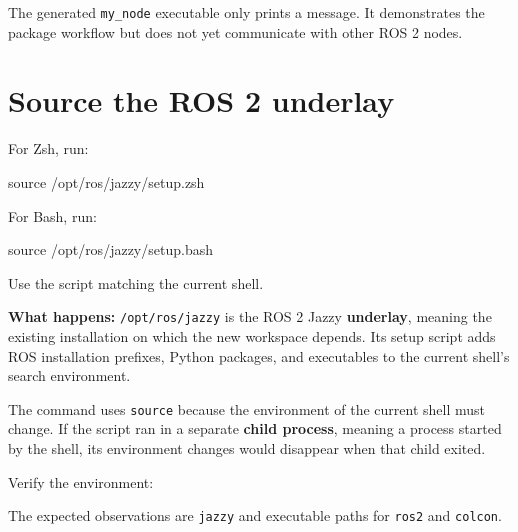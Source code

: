 \documentclass[
  australian,
  12pt,
  letterpaper,
  DIV=11,
  numbers=noendperiod,
  twoside]{scrreprt}
\newenvironment{Shaded}{\begin{snugshade}}{\end{snugshade}}
\newcommand{\AttributeTok}[1]{\textcolor[rgb]{0.40,0.45,0.13}{#1}}
\newcommand{\BuiltInTok}[1]{\textcolor[rgb]{0.00,0.23,0.31}{#1}}
\newcommand{\NormalTok}[1]{\textcolor[rgb]{0.00,0.23,0.31}{#1}}
\newcommand{\StringTok}[1]{\textcolor[rgb]{0.13,0.47,0.30}{#1}}
\newcommand{\VariableTok}[1]{\textcolor[rgb]{0.07,0.07,0.07}{#1}}
\begin{document}
The generated \texttt{my\_node} executable only prints a message. It
demonstrates the package workflow but does not yet communicate with
other ROS 2 nodes.

\section{Source the ROS 2 underlay}\label{source-the-ros-2-underlay}

For Zsh, run:

\begin{Shaded}
\begin{Highlighting}[]
\BuiltInTok{source}\NormalTok{ /opt/ros/jazzy/setup.zsh}
\end{Highlighting}
\end{Shaded}

For Bash, run:

\begin{Shaded}
\begin{Highlighting}[]
\BuiltInTok{source}\NormalTok{ /opt/ros/jazzy/setup.bash}
\end{Highlighting}
\end{Shaded}

Use the script matching the current shell.

\textbf{What happens:} \texttt{/opt/ros/jazzy} is the ROS 2 Jazzy
\textbf{underlay}, meaning the existing installation on which the new
workspace depends. Its setup script adds ROS installation prefixes,
Python packages, and executables to the current shell's search
environment.

The command uses \texttt{source} because the environment of the current
shell must change. If the script ran in a separate \textbf{child
process}, meaning a process started by the shell, its environment
changes would disappear when that child exited.

Verify the environment:

\begin{Shaded}
\end{Shaded}

The expected observations are \texttt{jazzy} and executable paths for
\texttt{ros2} and \texttt{colcon}.
\end{document}
